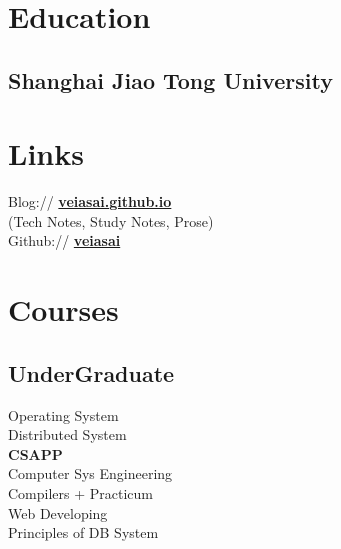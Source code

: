 \documentclass[]{deedy-resume-openfont}
\begin{document}
%
%
\lastupdated

%
%

%
%

\begin{minipage}[t]{0.25\textwidth} 


\section{Education} 
\sectionsep

\subsection{Shanghai Jiao Tong University}
\sectionsep


\section{Links}
\sectionsep
Blog://  \href{http://veiasai.github.io}{\bf veiasai.github.io} \\
(Tech Notes, Study Notes, Prose) \\
Github:// \href{https://github.com/veiasai}{\bf veiasai} \\
\sectionsep


\section{Courses}
\sectionsep
\subsection{UnderGraduate}
Operating System \\
Distributed System \\
\textbf{CSAPP} \\
Computer Sys Engineering \\
Compilers + Practicum \\
Web Developing \\
Principles of DB System  \\
\sectionsep


\end{minipage}
\end{document}
